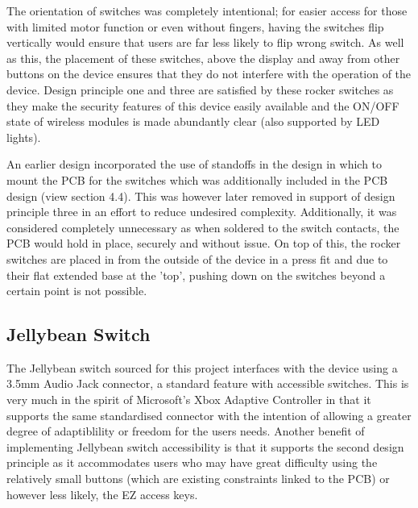The orientation of switches was completely intentional; for easier access for those with limited motor function or even without fingers, having the switches flip vertically would ensure that users are far less likely to flip wrong switch.
As well as this, the placement of these switches, above the display and away from other buttons on the device ensures that they do not interfere with the operation of the device.
Design principle one and three are satisfied by these rocker switches as they make the security features of this device easily available and the ON/OFF state of wireless modules is made abundantly clear (also supported by LED lights).

An earlier design incorporated the use of standoffs in the design in which to mount the PCB for the switches which was additionally included in the PCB design (view section 4.4). %
This was however later removed in support of design principle three in an effort to reduce undesired complexity.
Additionally, it was considered completely unnecessary as when soldered to the switch contacts, the PCB would hold in place, securely and without issue.
On top of this, the rocker switches are placed in from the outside of the device in a press fit and due to their flat extended base at the 'top', pushing down on the switches beyond a certain point is not possible.

\subsection{Jellybean Switch}

The Jellybean switch sourced for this project interfaces with the device using a 3.5mm Audio Jack connector, a standard feature with accessible switches.
This is very much in the spirit of Microsoft's Xbox Adaptive Controller\cite{adaptive} in that it supports the same standardised connector with the intention of allowing a greater degree of adaptiblility or freedom for the users needs.
Another benefit of implementing Jellybean switch accessibility is that it supports the second design principle as it accommodates users who may have great difficulty using the relatively small buttons (which are existing constraints linked to the PCB) or however less likely, the EZ access keys.

